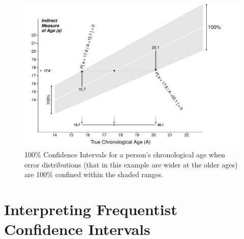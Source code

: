 \documentclass[10pt,handout]{beamer}\usepackage[]{graphicx}\usepackage[]{color}
\makeatletter
\def\maxwidth{ %
  \ifdim\Gin@nat@width>\linewidth
    \linewidth
  \else
    \Gin@nat@width
  \fi
}
\newenvironment{knitrout}{}{} %
\makeatother
\begin{document}
\begin{frame}



\begin{knitrout}\tiny
{}\color{fgcolor}\begin{figure}

{\centering \includegraphics[width=\maxwidth]{figure/unnamed-chunk-2-1} 

}

\caption[100\% Confidence Intervals for a person's chronological age when error distributions (that in this example are wider at the  older ages) are 100\% confined within the shaded ranges]{100\% Confidence Intervals for a person's chronological age when error distributions (that in this example are wider at the  older ages) are 100\% confined within the shaded ranges. }\label{fig:unnamed-chunk-2}
\end{figure}

\end{knitrout}


\end{frame}






\section{Interpreting Frequentist Confidence Intervals}
\end{document}
